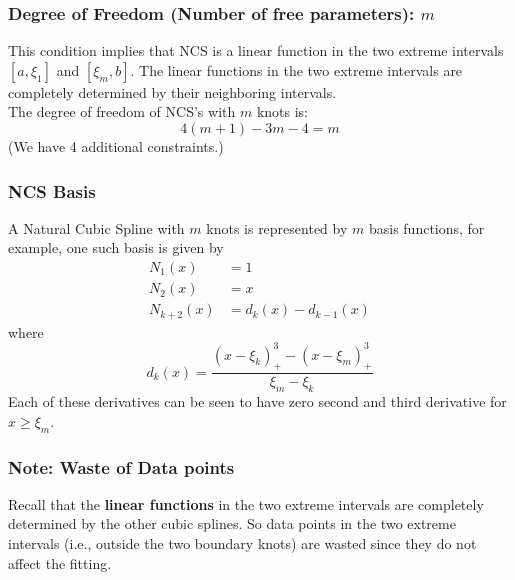 \documentclass[11pt,a4paper]{article}
\begin{document}
\subsubsection{Degree of Freedom (Number of free parameters): $m$}
This condition implies that NCS is a linear function in the two extreme intervals $\left[a, \xi_{1}\right]$ and $\left[\xi_{m}, b\right]$. The linear functions in the two extreme intervals are completely determined by their neighboring intervals.\\
The degree of freedom of NCS's with $m$ knots is:
$$
4(m+1)-3 m-4=m
$$
(We have 4 additional constraints.)

\subsubsection{NCS Basis}
A Natural Cubic Spline with $m$ knots is represented by $m$ basis functions, for example, one such basis is given by
$$
\begin{aligned}
N_{1}(x) &=1 \\
N_{2}(x) &=x \\
N_{k+2}(x) &=d_{k}(x)-d_{k-1}(x)
\end{aligned}
$$
where
$$
d_{k}(x)=\frac{\left(x-\xi_{k}\right)_{+}^{3}-\left(x-\xi_{m}\right)_{+}^{3}}{\xi_{m}-\xi_{k}}
$$
Each of these derivatives can be seen to have zero second and third derivative for $x \geq \xi_{m}$.

\subsubsection{Note: Waste of Data points}
Recall that the \textbf{linear functions} in the two extreme intervals are completely determined by the other cubic splines. So data points in the two extreme intervals (i.e., outside the two boundary knots) are wasted since they do not affect the fitting.\\
\end{document}
